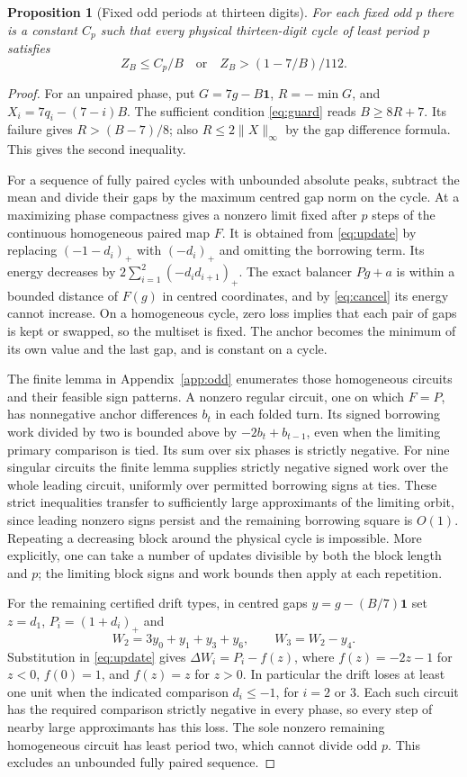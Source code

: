 \documentclass[11pt,reqno]{amsart}
\newtheorem{proposition}[theorem]{Proposition}
\theoremstyle{definition}
\begin{document}
\begin{proposition}[Fixed odd periods at thirteen digits]\label{prop:gap}
For each fixed odd \(p\) there is a constant \(C_p\) such that every physical thirteen-digit cycle of least period \(p\) satisfies
\[
 Z_B\le C_p/B\quad\text{or}\quad Z_B>(1-7/B)/112 .
\]
\end{proposition}
\begin{proof}
For an unpaired phase, put \(G=7g-B\mathbf1\), \(R=-\min G\), and \(X_i=7q_i-(7-i)B\). The sufficient condition \eqref{eq:guard} reads \(B\ge8R+7\). Its failure gives \(R>(B-7)/8\); also \(R\le2\|X\|_\infty\) by the gap difference formula. This gives the second inequality.

For a sequence of fully paired cycles with unbounded absolute peaks, subtract the mean and divide their gaps by the maximum centred gap norm on the cycle. At a maximizing phase compactness gives a nonzero limit fixed after \(p\) steps of the continuous homogeneous paired map \(F\). It is obtained from \eqref{eq:update} by replacing \((-1-d_i)_+\) with \((-d_i)_+\) and omitting the borrowing term. Its energy decreases by \(2\sum_{i=1}^2(-d_i d_{i+1})_+\). The exact balancer \(Pg+a\) is within a bounded distance of \(F(g)\) in centred coordinates, and by \eqref{eq:cancel} its energy cannot increase. On a homogeneous cycle, zero loss implies that each pair of gaps is kept or swapped, so the multiset is fixed. The anchor becomes the minimum of its own value and the last gap, and is constant on a cycle.

The finite lemma in Appendix~\ref{app:odd} enumerates those homogeneous circuits and their feasible sign patterns. A nonzero regular circuit, one on which \(F=P\), has nonnegative anchor differences \(b_t\) in each folded turn. Its signed borrowing work divided by two is bounded above by \(-2b_t+b_{t-1}\), even when the limiting primary comparison is tied. Its sum over six phases is strictly negative. For nine singular circuits the finite lemma supplies strictly negative signed work over the whole leading circuit, uniformly over permitted borrowing signs at ties. These strict inequalities transfer to sufficiently large approximants of the limiting orbit, since leading nonzero signs persist and the remaining borrowing square is \(O(1)\). Repeating a decreasing block around the physical cycle is impossible. More explicitly, one can take a number of updates divisible by both the block length and \(p\); the limiting block signs and work bounds then apply at each repetition.

For the remaining certified drift types, in centred gaps \(y=g-(B/7)\mathbf1\) set \(z=d_1\), \(P_i=(1+d_i)_+\) and
\[
 W_2=3y_0+y_1+y_3+y_6,\qquad W_3=W_2-y_4.
\]
Substitution in \eqref{eq:update} gives \(\Delta W_i=P_i-f(z)\), where \(f(z)=-2z-1\) for \(z<0\), \(f(0)=1\), and \(f(z)=z\) for \(z>0\). In particular the drift loses at least one unit when the indicated comparison \(d_i\le-1\), for \(i=2\) or 3. Each such circuit has the required comparison strictly negative in every phase, so every step of nearby large approximants has this loss. The sole nonzero remaining homogeneous circuit has least period two, which cannot divide odd \(p\). This excludes an unbounded fully paired sequence.
\end{proof}
\end{document}
